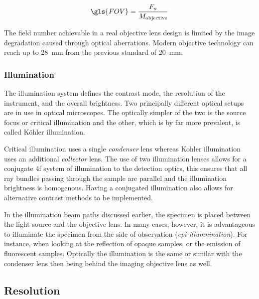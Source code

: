 \begin{align}
    \gls{FOV} = \frac{F_{n}}{M_{\text{objective}}}
\end{align}

The field number achievable in a real \gls{objective lens} design is limited by the image degradation caused through optical aberrations.
Modern objective technology can reach up to \SI{28}{\milli\meter} from the previous standard of \SI{20}{\milli\meter}.

\subsubsection{Illumination}

The illumination system defines the contrast mode, the resolution of the instrument, and the overall brightness.
Two principally different optical setups are in use in optical microscopes.
The optically simpler of the two is the source focus or critical illumination and the other, which is by far more prevalent, is called Köhler illumination.

Critical illumination uses a single \emph{condenser} lens whereas Kohler illumination uses an additional \emph{collector} lens.
The use of two illumination lenses allows for a conjugate \gls{4f}  system of illumination to the detection optics, this ensures that all ray bundles passing through the sample are parallel and the illumination brightness is homogenous.
Having a conjugated illumination also allows for alternative contrast methods to be implemented.

In the illumination beam paths discussed earlier, the specimen is placed between the light source and the \gls{objective lens}.
In many cases, however, it is advantageous to illuminate the specimen from the side of observation (\emph{epi-illumnination}).
For instance, when looking at the reflection of opaque samples, or the emission of fluorescent samples.
Optically the illumination is the same or similar with the condenser lens then being behind the imaging \gls{objective lens} as well.

\subsection{Resolution}\label{sec:resolution}

